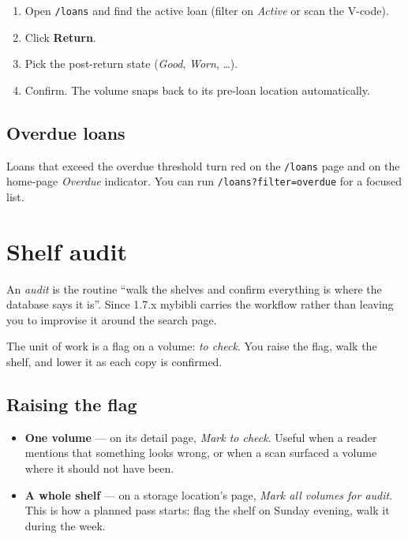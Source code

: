 \begin{enumerate}
  \item Open \texttt{/loans} and find the active loan (filter on
        \emph{Active} or scan the V-code).
  \item Click \textbf{Return}.
  \item Pick the post-return state (\emph{Good}, \emph{Worn},
        \dots).
  \item Confirm. The volume snaps back to its pre-loan
        location automatically.
\end{enumerate}

\subsection*{Overdue loans}

Loans that exceed the overdue threshold turn red on the
\texttt{/loans} page and on the home-page \emph{Overdue} indicator.
You can run \texttt{/loans?filter=overdue} for a focused list.

\section{Shelf audit}\label{sec:audit}

An \emph{audit} is the routine ``walk the shelves and
confirm everything is where the database says it is''. Since 1.7.x
mybibli carries the workflow rather than leaving you to improvise it
around the search page.

The unit of work is a flag on a volume: \emph{to check}. You raise the
flag, walk the shelf, and lower it as each copy is confirmed.

\subsection*{Raising the flag}

\begin{itemize}
  \item \textbf{One volume} — on its detail page, \emph{Mark to check}.
        Useful when a reader mentions that something looks wrong, or
        when a scan surfaced a volume where it should not have been.
  \item \textbf{A whole shelf} — on a storage location's page,
        \emph{Mark all volumes for audit}. This is how a planned pass
        starts: flag the shelf on Sunday evening, walk it during the
        week.
\end{itemize}

